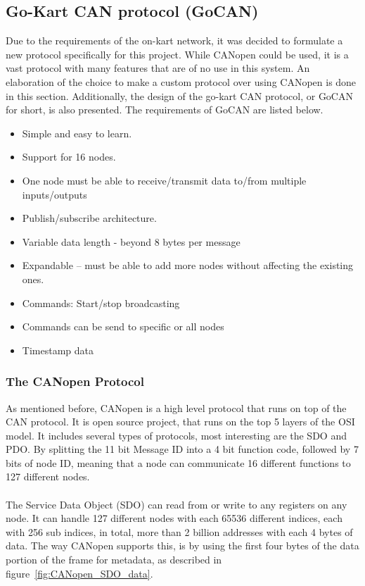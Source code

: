 
\subsection{Go-Kart CAN protocol (GoCAN)}\label{sub:CAN_protocol}
Due to the requirements of the on-kart network, it was decided to formulate a new protocol specifically for this project.
While CANopen could be used, it is a vast protocol with many features that are of no use in this system.
An elaboration of the choice to make a custom protocol over using CANopen is done in this section.
Additionally, the design of the go-kart CAN protocol, or GoCAN for short, is also presented.
The requirements of GoCAN are listed below.

\begin{itemize}
	\item Simple and easy to learn.
	\item Support for 16 nodes.
	\item One node must be able to receive/transmit data to/from multiple inputs/outputs
	\item Publish/subscribe architecture.
	\item Variable data length - beyond 8 bytes per message
	\item Expandable -- must be able to add more nodes without affecting the existing ones.
	\item Commands: Start/stop broadcasting 
	\item Commands can be send to specific or all nodes
	\item Timestamp data
\end{itemize}

\subsubsection*{The CANopen Protocol}
\label{sub:CANopen}
As mentioned before, CANopen is a high level protocol that runs on top of the CAN protocol.
It is open source project, that runs on the top 5 layers of the OSI model\cite{CANopen_introduction}.
It includes several types of protocols, most interesting are the SDO and PDO. 
By splitting the 11 bit Message ID into a 4 bit function code, followed by 7 bits of node ID, meaning that a node can communicate 16 different functions to 127 different nodes.
\\~\\
The Service Data Object (SDO) can read from or write to any registers on any node. 
It can handle 127 different nodes with each 65536 different indices, each with 256 sub indices, in total, more than 2 billion addresses with each 4 bytes of data.
The way CANopen supports this, is by using the first four bytes of the data portion of the frame for metadata, as described in figure~\ref{fig:CANopen_SDO_data}.

